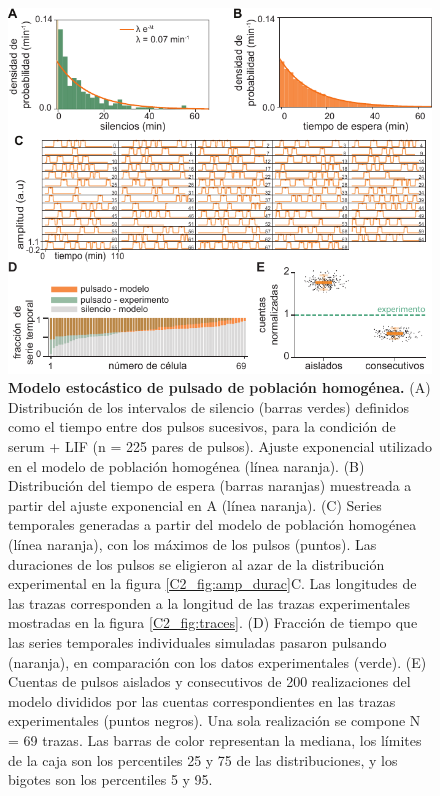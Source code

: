 \documentclass[./main.tex]{subfiles}
\begin{document}
\begin{figure}
    \centering
    \includegraphics[width=1\columnwidth]{figures/chapter2/C2_pulsado_estocastico_homog.pdf}\caption{\textbf{Modelo estocástico de pulsado de población homogénea.} (A) Distribución de los intervalos de silencio (barras verdes) definidos como el tiempo entre dos pulsos sucesivos, para la condición de serum + LIF (n = 225 pares de pulsos). Ajuste exponencial utilizado en el modelo de población homogénea (línea naranja). (B) Distribución del tiempo de espera (barras naranjas) muestreada a partir del ajuste exponencial en A (línea naranja). (C) Series temporales generadas a partir del modelo de población homogénea (línea naranja), con los máximos de los pulsos (puntos). Las duraciones de los pulsos se eligieron al azar de la distribución experimental en la figura \ref{C2_fig:amp_durac}C. Las longitudes de las trazas corresponden a la longitud de las trazas experimentales mostradas en la figura \ref{C2_fig:traces}. (D) Fracción de tiempo que las series temporales individuales simuladas pasaron pulsando (naranja), en comparación con los datos experimentales (verde). (E) Cuentas de pulsos aislados y consecutivos de 200 realizaciones del modelo divididos por las cuentas correspondientes en las trazas experimentales (puntos negros). Una sola realización se compone N = 69 trazas. Las barras de color representan la mediana, los límites de la caja son los percentiles 25 y 75 de las distribuciones, y los bigotes son los percentiles 5 y 95. }
    \label{C2_fig:pulsos_estocasticos_homog}
\end{figure}
\end{document}
